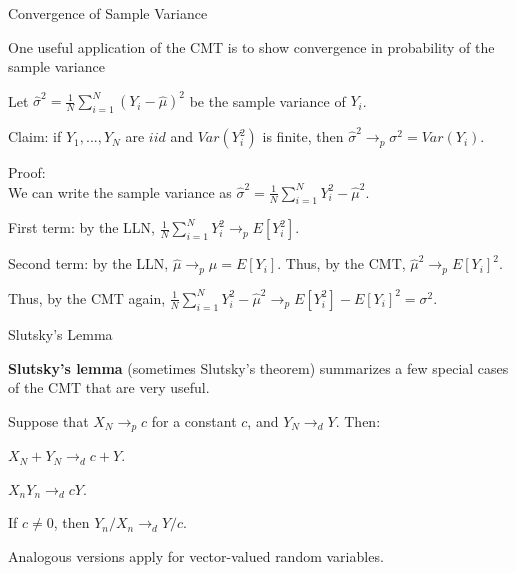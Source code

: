 \documentclass[11pt,english,handout]{beamer}
\newenvironment{wideitemize}{\itemize\addtolength{\itemsep}{10pt}}{\enditemize}
\begin{document}
\begin{frame}{Convergence of Sample Variance}
\begin{wideitemize}
\item
One useful application of the CMT is to show convergence in probability of the sample variance

\pause
\item
Let $\hat\sigma^2 = \frac{1}{N} \sum_{i=1}^N (Y_i - \hat\mu)^2$ be the sample variance of $Y_i$.

\pause
\item
Claim: if $Y_1,...,Y_N$ are $iid$ and $Var(Y_i^2)$ is finite, then $\hat\sigma^2 \rightarrow_p \sigma^2 = Var(Y_i)$. 

\pause
\item
Proof: \\

We can write the sample variance as $\hat\sigma^2 = \frac{1}{N} \sum_{i=1}^N Y_i^2 - \hat\mu^2$. \\ \vspace{.1cm} \pause

First term: by the LLN, $ \frac{1}{N} \sum_{i=1}^N Y_i^2 \rightarrow_p E[Y_i^2]$. \\ \vspace{.1cm} \pause

Second term: by the LLN, $\hat\mu \rightarrow_p \mu = E[Y_i]$. Thus, by the CMT, $\hat\mu^2 \rightarrow_p E[Y_i]^2$.\\ \vspace{.1cm} \pause

Thus, by the CMT again, $\frac{1}{N} \sum_{i=1}^N Y_i^2 - \hat\mu^2 \rightarrow_p E[Y_i^2] - E[Y_i]^2 = \sigma^2$. 

\end{wideitemize}		
\end{frame}

\begin{frame}{Slutsky's Lemma}

\begin{wideitemize}

\item
\textbf{Slutsky's lemma} (sometimes Slutsky's theorem) summarizes a few special cases of the CMT that are very useful. 

\pause
\item
Suppose that $X_N \rightarrow_p c$ for a constant $c$, and $Y_N \rightarrow_d Y$. Then: 

\item
$X_N + Y_N \rightarrow_d c + Y$. \pause

\item
$X_n Y_n \rightarrow_d c Y$. \pause

\item
If $c \neq 0$, then $Y_n/ X_n \rightarrow_d Y /c$. 

\pause
\item
Analogous versions apply for vector-valued random variables.
\end{wideitemize}
	
\end{frame}
\end{document}
